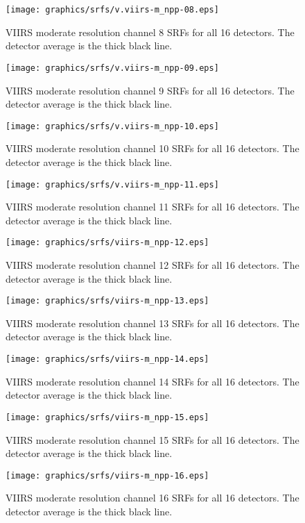 \begin{figure}[H]
  \centering
  \texttt{[image: graphics/srfs/v.viirs-m\_npp-08.eps]}
  \caption{VIIRS moderate resolution channel 8 SRFs for all 16 detectors. The detector average is the thick black line.}
  \label{fig:v.viirs-m_npp-08}
\end{figure}
\begin{figure}[H]
  \centering
  \texttt{[image: graphics/srfs/v.viirs-m\_npp-09.eps]}
  \caption{VIIRS moderate resolution channel 9 SRFs for all 16 detectors. The detector average is the thick black line.}
  \label{fig:v.viirs-m_npp-09}
\end{figure}
\begin{figure}[H]
  \centering
  \texttt{[image: graphics/srfs/v.viirs-m\_npp-10.eps]}
  \caption{VIIRS moderate resolution channel 10 SRFs for all 16 detectors. The detector average is the thick black line.}
  \label{fig:v.viirs-m_npp-10}
\end{figure}
\begin{figure}[H]
  \centering
  \texttt{[image: graphics/srfs/v.viirs-m\_npp-11.eps]}
  \caption{VIIRS moderate resolution channel 11 SRFs for all 16 detectors. The detector average is the thick black line.}
  \label{fig:v.viirs-m_npp-11}
\end{figure}
\begin{figure}[H]
  \centering
  \texttt{[image: graphics/srfs/viirs-m\_npp-12.eps]}
  \caption{VIIRS moderate resolution channel 12 SRFs for all 16 detectors. The detector average is the thick black line.}
  \label{fig:viirs-m_npp-12}
\end{figure}
\begin{figure}[H]
  \centering
  \texttt{[image: graphics/srfs/viirs-m\_npp-13.eps]}
  \caption{VIIRS moderate resolution channel 13 SRFs for all 16 detectors. The detector average is the thick black line.}
  \label{fig:viirs-m_npp-13}
\end{figure}
\begin{figure}[H]
  \centering
  \texttt{[image: graphics/srfs/viirs-m\_npp-14.eps]}
  \caption{VIIRS moderate resolution channel 14 SRFs for all 16 detectors. The detector average is the thick black line.}
  \label{fig:viirs-m_npp-14}
\end{figure}
\begin{figure}[H]
  \centering
  \texttt{[image: graphics/srfs/viirs-m\_npp-15.eps]}
  \caption{VIIRS moderate resolution channel 15 SRFs for all 16 detectors. The detector average is the thick black line.}
  \label{fig:viirs-m_npp-15}
\end{figure}
\begin{figure}[H]
  \centering
  \texttt{[image: graphics/srfs/viirs-m\_npp-16.eps]}
  \caption{VIIRS moderate resolution channel 16 SRFs for all 16 detectors. The detector average is the thick black line.}
  \label{fig:viirs-m_npp-16}
\end{figure}


